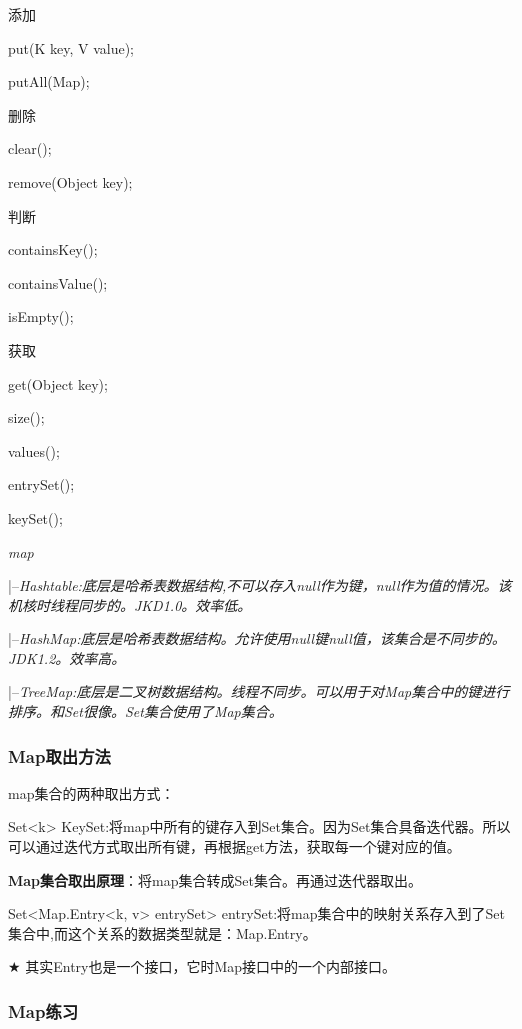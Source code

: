 \documentclass[UTF8]{ctexart}
\begin{document}
\textbullet 添加

\qquad put(K key, V value);

\qquad putAll(Map);

\textbullet 删除

\qquad clear();

\qquad remove(Object key);

\textbullet 判断

\qquad containsKey();

\qquad containsValue();

\qquad isEmpty();

\textbullet 获取

\qquad get(Object key);

\qquad size();

\qquad values();

\qquad entrySet();

\qquad keySet();


\em{map}

\qquad |--\em{Hashtable}:底层是哈希表数据结构,不可以存入null作为键，null作为值的情况。该机核时线程同步的。JKD1.0。效率低。

\qquad |--\em{HashMap}:底层是哈希表数据结构。允许使用null键null值，该集合是不同步的。JDK1.2。效率高。

\qquad |--\em{TreeMap}:底层是二叉树数据结构。线程不同步。可以用于对Map集合中的键进行排序。和Set很像。Set集合使用了Map集合。


\subsubsection{Map取出方法}

map集合的两种取出方式：

\textbullet Set<k> KeySet:将map中所有的键存入到Set集合。因为Set集合具备迭代器。所以可以通过迭代方式取出所有键，再根据get方法，获取每一个键对应的值。

\textbf{Map集合取出原理}：将map集合转成Set集合。再通过迭代器取出。

\textbullet Set<Map.Entry<k, v> entrySet> entrySet:将map集合中的映射关系存入到了Set集合中,而这个关系的数据类型就是：Map.Entry。


$\bigstar$ 其实Entry也是一个接口，它时Map接口中的一个内部接口。


\subsubsection{Map练习}

\end{document}
